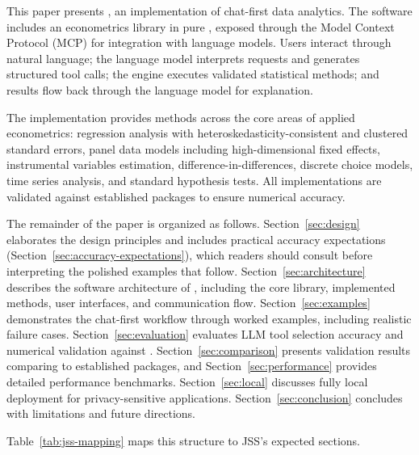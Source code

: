 This paper presents , an implementation of
chat-first data analytics. The software includes an econometrics
library in pure , exposed through the Model Context
Protocol (MCP) for integration with language models. Users interact through
natural language; the language model interprets requests and generates
structured tool calls; the  engine executes validated
statistical methods; and results flow back through the language model for
explanation.

The implementation provides methods across the core areas of applied
econometrics: regression analysis with heteroskedasticity-consistent and
clustered standard errors, panel data models including high-dimensional
fixed effects, instrumental variables estimation, difference-in-differences,
discrete choice models, time series analysis, and standard hypothesis tests.
All implementations are validated against established  packages
to ensure numerical accuracy.

The remainder of the paper is organized as follows. Section~\ref{sec:design}
elaborates the design principles and includes practical accuracy expectations
(Section~\ref{sec:accuracy-expectations}), which readers should consult before
interpreting the polished examples that follow. Section~\ref{sec:architecture}
describes the software architecture of , including the
core library, implemented methods, user interfaces, and communication flow.
Section~\ref{sec:examples} demonstrates the chat-first workflow through worked
examples, including realistic failure cases. Section~\ref{sec:evaluation}
evaluates LLM tool selection accuracy and numerical validation against
.
Section~\ref{sec:comparison} presents validation results comparing
 to established  packages, and
Section~\ref{sec:performance} provides detailed performance benchmarks.
Section~\ref{sec:local} discusses fully local deployment for
privacy-sensitive applications. Section~\ref{sec:conclusion} concludes with
limitations and future directions.

Table~\ref{tab:jss-mapping} maps this structure to JSS's expected sections.

